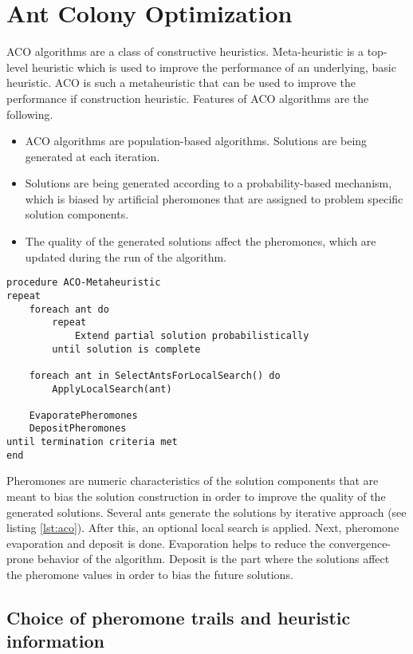 \section{Ant Colony Optimization}

ACO algorithms are a class of constructive heuristics. Meta-heuristic is a top-level heuristic which is used to improve the performance of an underlying, basic heuristic. ACO is such a metaheuristic that can be used to improve the performance if construction heuristic. Features of ACO algorithms are the following.

\begin{itemize}
\item ACO algorithms are population-based algorithms. Solutions are being generated at each iteration.
\item Solutions are being generated according to a probability-based mechanism, which is biased by artificial pheromones that are assigned to problem specific solution components.
\item The quality of the generated solutions affect the pheromones, which are updated during the run of the algorithm.
\end{itemize}


\begin{minipage}[c, breaklines=true]{0.95\textwidth}
\begin{lstlisting}[caption={General ACO pseudo-code}, label={lst:aco}]
procedure ACO-Metaheuristic
repeat
	foreach ant do
		repeat
			Extend partial solution probabilistically
		until solution is complete
	
	foreach ant in SelectAntsForLocalSearch() do
		ApplyLocalSearch(ant)
	
	EvaporatePheromones
	DepositPheromones
until termination criteria met
end
\end{lstlisting}
\end{minipage}

Pheromones are numeric characteristics of the solution components that are meant to bias the solution construction in order to improve the quality of the generated solutions. Several ants generate the solutions by iterative approach (see listing \ref{lst:aco}). After this, an optional local search is applied. Next, pheromone evaporation and deposit is done. Evaporation helps to reduce the convergence-prone behavior of the algorithm. Deposit is the part where the solutions affect the pheromone values in order to bias the future solutions.

\subsection{Choice of pheromone trails and heuristic information}

